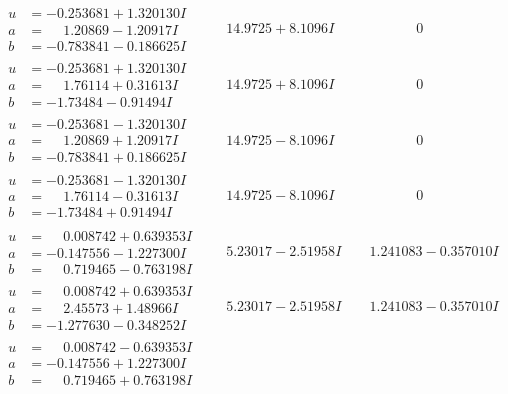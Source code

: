 \documentclass[1p]{elsarticle_modified}
\theoremstyle{definition}
\begin{document}
$$\begin{array}{c|c|c}
\begin{aligned}
u &= -0.253681 + 1.320130 I \\
a &= \phantom{-}1.20869 - 1.20917 I \\
b &= -0.783841 - 0.186625 I\end{aligned}
 & \phantom{-}14.9725 + 8.1096 I & \phantom{-0.000000 } 0 \\ \hline\begin{aligned}
u &= -0.253681 + 1.320130 I \\
a &= \phantom{-}1.76114 + 0.31613 I \\
b &= -1.73484 - 0.91494 I\end{aligned}
 & \phantom{-}14.9725 + 8.1096 I & \phantom{-0.000000 } 0 \\ \hline\begin{aligned}
u &= -0.253681 - 1.320130 I \\
a &= \phantom{-}1.20869 + 1.20917 I \\
b &= -0.783841 + 0.186625 I\end{aligned}
 & \phantom{-}14.9725 - 8.1096 I & \phantom{-0.000000 } 0 \\ \hline\begin{aligned}
u &= -0.253681 - 1.320130 I \\
a &= \phantom{-}1.76114 - 0.31613 I \\
b &= -1.73484 + 0.91494 I\end{aligned}
 & \phantom{-}14.9725 - 8.1096 I & \phantom{-0.000000 } 0 \\ \hline\begin{aligned}
u &= \phantom{-}0.008742 + 0.639353 I \\
a &= -0.147556 - 1.227300 I \\
b &= \phantom{-}0.719465 - 0.763198 I\end{aligned}
 & \phantom{-}5.23017 - 2.51958 I & \phantom{-}1.241083 - 0.357010 I \\ \hline\begin{aligned}
u &= \phantom{-}0.008742 + 0.639353 I \\
a &= \phantom{-}2.45573 + 1.48966 I \\
b &= -1.277630 - 0.348252 I\end{aligned}
 & \phantom{-}5.23017 - 2.51958 I & \phantom{-}1.241083 - 0.357010 I \\ \hline\begin{aligned}
u &= \phantom{-}0.008742 - 0.639353 I \\
a &= -0.147556 + 1.227300 I \\
b &= \phantom{-}0.719465 + 0.763198 I\end{aligned}

\end{array}$$
\end{document}
